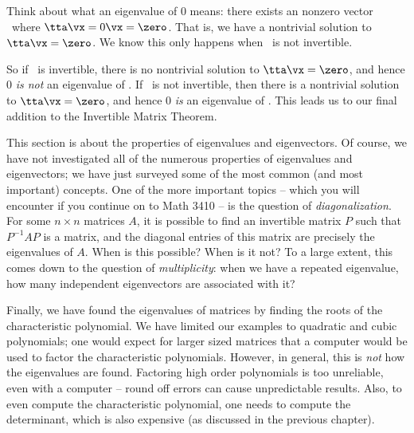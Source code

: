 Think about what an eigenvalue of 0 means: there exists an nonzero vector \vx\ where $\tta\vx = 0\vx = \zero$. That is, we have a nontrivial solution to $\tta\vx = \zero$. We know this only happens when \tta\ is not invertible. 

So if \tta\ is invertible, there is no nontrivial solution to $\tta\vx=\zero$, and hence 0 \textit{is not} an eigenvalue of \tta. If \tta\ is not invertible, then there is a nontrivial solution to $\tta\vx=\zero$, and hence 0 \textit{is} an eigenvalue of \tta. This leads us to our final addition to the Invertible Matrix Theorem.

\smallskip


\smallskip


This section is about the properties of eigenvalues and eigenvectors. Of course, we have not investigated all of the numerous properties of eigenvalues and eigenvectors; we have just surveyed some of the most common (and most important) concepts. One of the more important topics -- which you will encounter if you continue on to Math 3410 -- is the question of \textit{diagonalization}. For some $n\times n$ matrices $A$, it is possible to find an invertible matrix $P$ such that $P^{-1}AP$ is a  matrix, and the diagonal entries of this matrix are precisely the eigenvalues of $A$. When is this possible? When is it not? To a large extent, this comes down to the question of \textit{multiplicity}: when we have a repeated eigenvalue, how many independent eigenvectors are associated with it?

Finally, we have found the eigenvalues of matrices by finding the roots of the characteristic polynomial. We have limited our examples to quadratic and cubic polynomials; one would expect for larger sized matrices that a computer would be used to factor the characteristic polynomials. However, in general, this is \textit{not} how the eigenvalues are found. Factoring high order polynomials is too unreliable, even with a computer -- round off errors can cause unpredictable results. Also, to even compute the characteristic polynomial, one needs to compute the determinant, which is also expensive (as discussed in the previous chapter). 

